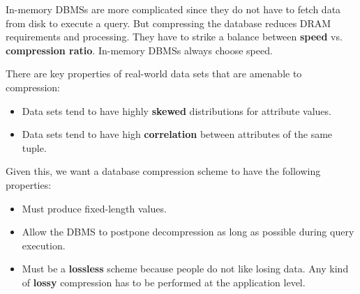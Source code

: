 \documentclass[11pt]{article}
\begin{document}
In-memory DBMSs are more complicated since they do not have to fetch data from disk to execute a 
query. But compressing the database reduces DRAM requirements and processing. They have to strike a 
balance between \textbf{speed} vs. \textbf{compression ratio}. In-memory DBMSs always choose 
speed.

There are key properties of real-world data sets that are amenable to compression:
\begin{itemize}
    \item
    Data sets tend to have highly \textbf{skewed} distributions for attribute values.
    
    \item
    Data sets tend to have high \textbf{correlation} between attributes of the same 
    tuple.
\end{itemize}

Given this, we want a database compression scheme to have the following properties:
\begin{itemize}
    \item
    Must produce fixed-length values.
    
    \item
    Allow the DBMS to postpone decompression as long as possible during query execution.
    
    \item
    Must be a \textbf{lossless} scheme because people do not like losing data. 
    Any kind of \textbf{lossy} compression has to be performed at the application level.
\end{itemize}
% 

\end{document}
